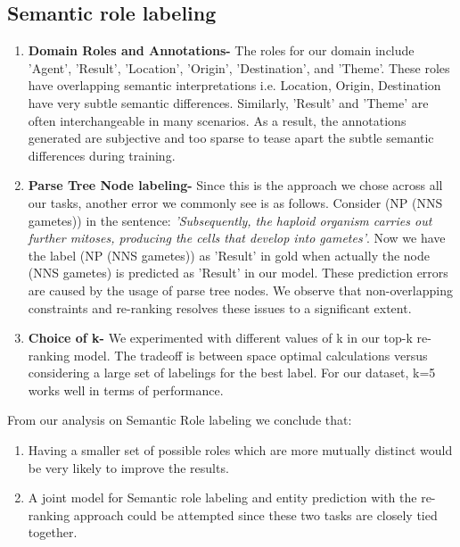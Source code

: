\subsection{Semantic role labeling}
\begin{enumerate}
\item {\bf Domain Roles and Annotations-} The roles for our domain include 'Agent', 'Result', 'Location', 'Origin', 'Destination', and 'Theme'. These roles have overlapping semantic interpretations i.e. Location, Origin, Destination have very subtle semantic differences. Similarly, 'Result' and 'Theme' are often interchangeable in many scenarios. As a result, the annotations generated are subjective and too sparse to tease apart the subtle semantic differences during training.

\item {\bf Parse Tree Node labeling-} Since this is the approach we chose across all our tasks, another error we commonly see is as follows. Consider (NP (NNS gametes)) in the sentence: {\em 'Subsequently, the haploid organism carries out further mitoses, producing the cells that develop into gametes'}. Now we have the label (NP (NNS gametes)) as 'Result' in gold when actually the node (NNS gametes)  is predicted as 'Result' in our model. These prediction errors are caused by the usage of parse tree nodes. We observe that non-overlapping constraints and re-ranking resolves these issues to a significant extent.
\item {\bf Choice of k-} We experimented with different values of k in our top-k re-ranking model. The tradeoff is between space optimal calculations versus considering a large set of labelings for the best label. For our dataset, k=5 works well in terms of performance.
\end{enumerate}

From our analysis on Semantic Role labeling we conclude that:
\begin{enumerate}
\item Having a smaller set of possible roles which are more mutually distinct would be very likely to improve the results.
\item A joint model for Semantic role labeling and entity prediction with the re-ranking approach could be attempted since these two tasks are closely tied together.
\end{enumerate}
